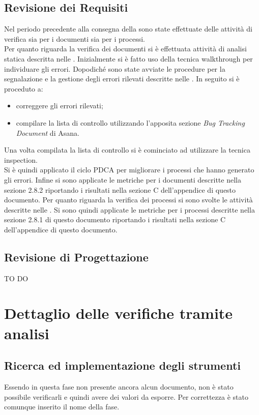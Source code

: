 	\subsection{Revisione dei Requisiti}
	Nel periodo precedente alla consegna della \RR{} sono state effettuate delle attività di verifica sia per i documenti sia per i processi.\\
	Per quanto riguarda la verifica dei documenti si è effettuata attività di analisi statica descritta nelle \docNameVersionNdP. Inizialmente si è fatto uso della tecnica 	walkthrough per individuare gli errori. Dopodiché sono state avviate le procedure per la segnalazione e la gestione degli errori rilevati descritte nelle \docNameVersionNdP.
	In seguito si è proceduto a:
	\begin{itemize}
		\item correggere gli errori rilevati;
		\item compilare la lista di controllo utilizzando l'apposita sezione \emph{Bug Tracking Document} di Asana.
	\end{itemize}
	Una volta compilata la lista di controllo si è cominciato ad utilizzare la tecnica inspection.\\
	Si è quindi applicato il ciclo PDCA per migliorare i processi che hanno generato gli errori. Infine si sono applicate le metriche per i documenti descritte nella sezione 2.8.2 riportando i risultati nella sezione C dell'appendice di questo documento.
	Per quanto riguarda la verifica dei processi si sono svolte le attività descritte nelle \docNameVersionNdP{}. Si sono quindi applicate le metriche per i processi descritte nella sezione 2.8.1 di questo documento riportando i risultati nella sezione C dell'appendice di questo documento.
	\subsection{Revisione di Progettazione}
	TO DO
\pagebreak

\section{Dettaglio delle verifiche tramite analisi}
	\subsection{Ricerca ed implementazione degli strumenti}
	Essendo in questa fase non presente ancora alcun documento, non è stato possibile verificarli e quindi avere dei valori da esporre. Per correttezza è stato comunque inserito il nome della fase.


